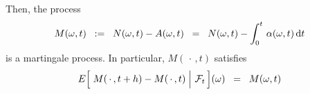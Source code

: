 \noindent
Then, the process
\begin{equation*}
M(\omega,t)
\;\; := \;\; N(\omega,t) - A(\omega,t)
\;\;  = \;\; N(\omega,t) - \int^{t}_{0}\,\alpha(\omega,t)\,\textnormal{d} t
\end{equation*}
is a martingale process.
In particular, $M(\,\cdot\,,t)$ satisfies
\begin{equation*}
E\!\left[\,\left.M(\,\cdot\,,t+h) \overset{{\color{white}.}}{-} M(\,\cdot\,,t)\;\right\vert\,\mathcal{F}_{t}\,\right]\!(\omega)
\;\; = \;\; M(\omega,t)
\end{equation*}


\renewcommand{\theenumi}{\roman{enumi}}
\renewcommand{\labelenumi}{\textnormal{(\theenumi)}$\;\;$}

